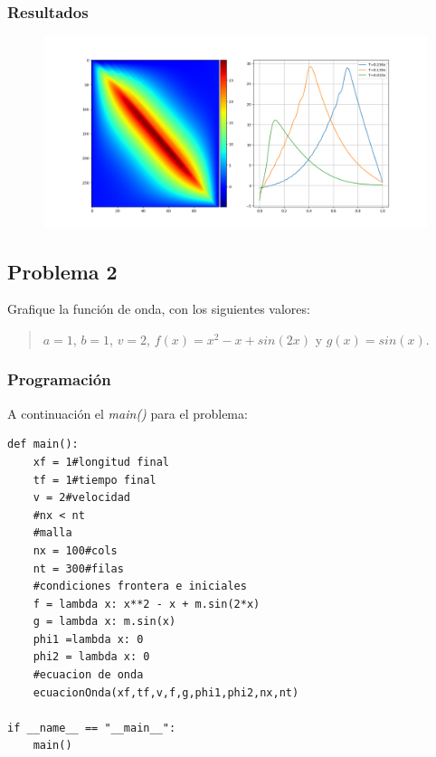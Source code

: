\documentclass[a4paper,12pt]{article}
\newcommand{\eq}[1]{$#1$}
\begin{document}
    \subsubsection{Resultados}
    \begin{figure}[h]
        \centering
        \includegraphics[width=\textwidth]{graph1.png}
    \end{figure}

    \subsection{Problema 2}
    Grafique la función de onda, con los siguientes valores:
    \begin{quote}
        \centering
        \eq{a = 1}, \eq{b = 1}, \eq{v = 2}, \eq{f(x) = x^2 - x + sin(2x)} y \eq{g(x) = sin(x)}.
    \end{quote}
    \subsubsection{Programación}
    A continuación el \emph{main()} para el problema:

\begin{lstlisting}[frame=single]
def main():
    xf = 1#longitud final
    tf = 1#tiempo final
    v = 2#velocidad 
    #nx < nt
    #malla
    nx = 100#cols
    nt = 300#filas
    #condiciones frontera e iniciales
    f = lambda x: x**2 - x + m.sin(2*x)
    g = lambda x: m.sin(x)
    phi1 =lambda x: 0
    phi2 = lambda x: 0
    #ecuacion de onda
    ecuacionOnda(xf,tf,v,f,g,phi1,phi2,nx,nt)

if __name__ == "__main__":
    main()
\end{lstlisting}
\end{document}
